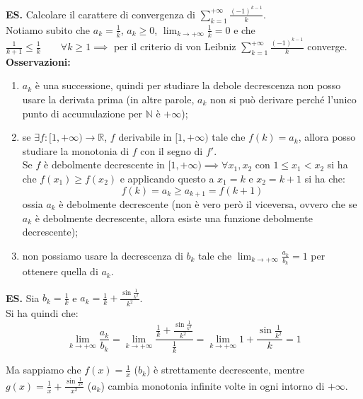 \documentclass{article}
\begin{document}
\noindent\textbf{ES.} Calcolare il carattere di convergenza di $\sum_{k = 1}^{+\infty} \frac{(-1)^{k - 1}}{k}$.\\
Notiamo subito che $a_k = \frac{1}{k}$, $a_k \geq 0$, $\lim_{k \to +\infty} \frac{1}{k} = 0$ e che $\frac{1}{k + 1} \leq \frac{1}{k} \qquad \forall k \geq 1 \implies$ per il criterio di von Leibniz $\sum_{k = 1}^{+\infty} \frac{(-1)^{k - 1}}{k}$ converge.\\

\noindent\textbf{Osservazioni:}
\begin{enumerate}
    \item $a_k$ è una successione, quindi per studiare la debole decrescenza non posso usare la derivata prima (in altre parole, $a_k$ non si può derivare perché l'unico punto di accumulazione per $\mathbb{N}$ è $+\infty$);
    \item se $\exists f: [1, +\infty) \xrightarrow{} \mathbb{R}$, $f$ derivabile in $[1, +\infty)$ tale che $f(k) = a_k$, allora posso studiare la monotonia di $f$ con il segno di $f'$. \\
    Se $f$ è debolmente decrescente in $[1, +\infty) \implies \forall x_1, x_2$ con $1 \leq x_1 < x_2$ si ha che $f(x_1) \geq f(x_2)$ e applicando questo a $x_1 = k$ e $x_2 = k + 1$ si ha che: $$f(k) = a_k \geq a_{k + 1} = f(k + 1)$$ ossia $a_k$ è debolmente decrescente (non è vero però il viceversa, ovvero che se $a_k$ è debolmente decrescente, allora esiste una funzione debolmente decrescente);
    \item non possiamo usare la decrescenza di $b_k$ tale che $\lim_{k \to +\infty} \frac{a_k}{b_k} = 1$ per ottenere quella di $a_k$.
\end{enumerate}

\noindent\textbf{ES.} Sia $b_k = \frac{1}{k}$ e $a_k = \frac{1}{k} + \frac{\sin\frac{1}{k^2}}{k^2}$.\\
Si ha quindi che:
\begin{equation*}
    \lim_{k \to +\infty} \frac{a_k}{b_k} = \lim_{k \to +\infty} \frac{\frac{1}{k} + \frac{\sin\frac{1}{k^2}}{k^2}}{\frac{1}{k}} = \lim_{k \to +\infty} 1 + \frac{\sin\frac{1}{k^2}}{k} = 1
\end{equation*}

\noindent Ma sappiamo che $f(x) = \frac{1}{x}$ ($b_k$) è strettamente decrescente, mentre $g(x) = \frac{1}{x} + \frac{\sin\frac{1}{x^2}}{x^2}$ ($a_k$) cambia monotonia infinite volte in ogni intorno di $+\infty$.
\end{document}
